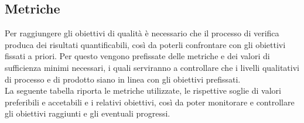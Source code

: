 \subsection{Metriche}
Per raggiungere gli obiettivi di qualità è necessario che il processo di verifica produca dei risultati quantificabili, così da poterli confrontare con gli obiettivi fissati a priori. Per questo vengono prefissate delle metriche e dei valori di sufficienza minimi necessari, i quali serviranno a controllare che i livelli qualitativi di processo e di prodotto siano in linea con gli obiettivi prefissati.\\La seguente tabella riporta le metriche utilizzate, le rispettive soglie di valori preferibili e accetabili e i relativi obiettivi, così da poter monitorare e controllare gli obiettivi raggiunti e gli eventuali progressi.

